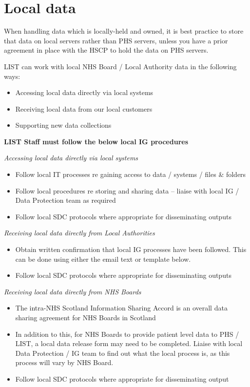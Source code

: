 \documentclass[
]{book}
\begin{document}
\hypertarget{local-data}{%
\section{Local data}\label{local-data}}

When handling data which is locally-held and owned, it is best practice to store that data on local servers rather than PHS servers, unless you have a prior agreement in place with the HSCP to hold the data on PHS servers.

LIST can work with local NHS Board / Local Authority data in the following ways:

\begin{itemize}
\item
  Accessing local data directly via local systems
\item
  Receiving local data from our local customers
\item
  Supporting new data collections
\end{itemize}

\textbf{LIST Staff must follow the below local IG procedures}

\emph{Accessing local data directly via local systems}

\begin{itemize}
\item
  Follow local IT processes re gaining access to data / systems / files \& folders
\item
  Follow local procedures re storing and sharing data -- liaise with local IG / Data Protection team as required
\item
  Follow local SDC protocols where appropriate for disseminating outputs
\end{itemize}

\emph{Receiving local data directly from Local Authorities}

\begin{itemize}
\item
  Obtain written confirmation that local IG processes have been followed. This can be done using either the email text or template below.
\item
  Follow local SDC protocols where appropriate for disseminating outputs
\end{itemize}

\emph{Receiving local data directly from NHS Boards}

\begin{itemize}
\item
  The intra-NHS Scotland Information Sharing Accord is an overall data sharing agreement for NHS Boards in Scotland
\item
  In addition to this, for NHS Boards to provide patient level data to PHS / LIST, a local data release form may need to be completed. Liaise with local Data Protection / IG team to find out what the local process is, as this process will vary by NHS Board.
\item
  Follow local SDC protocols where appropriate for disseminating output
\end{itemize}
\end{document}
